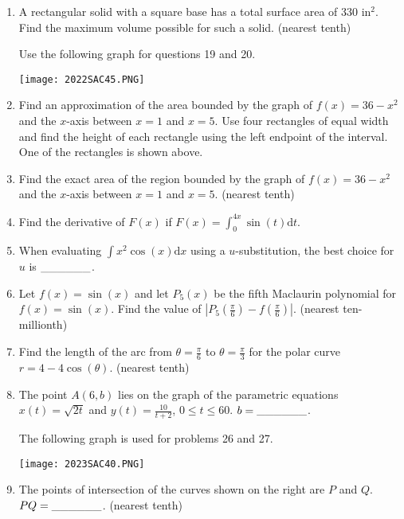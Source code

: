 \documentclass[../uilmath.tex]{subfiles}
\begin{document}
\begin{enumerate}[label=\bfseries\arabic*.]
    \item %
    A rectangular solid with a square base has a total surface area of 330 in$^2$. Find the maximum volume possible for such a solid. (nearest tenth)


    Use the following graph for questions 19 and 20.
    \begin{center}
        \texttt{[image: 2022SAC45.PNG]}
    \end{center}
    \item %
    Find an approximation of the area bounded by the graph of $f(x)=36-x^2$ and the $x$-axis between $x=1$ and $x=5$. 
    Use four rectangles of equal width and find the height of each rectangle using the left endpoint of the interval. One of the rectangles is shown above.

    \item %
    Find the exact area of the region bounded by the graph of $f(x)=36-x^2$ and the $x$-axis between $x=1$ and $x=5$. (nearest tenth)

    \item %
    Find the derivative of $F(x)$ if $F(x)=\int_0^{4x}\sin(t)\mathrm{d}t$.

    \item %
    When evaluating $\int x^2\cos(x)\mathrm{d}x$ using a $u$-substitution, the best choice for $u$ is $\_\_\_\_\_\_$.

    \item %
    Let $f(x)=\sin(x)$ and let $P_5(x)$ be the fifth Maclaurin polynomial for $f(x)=\sin(x)$. Find the value of 
    $\left|P_5\left(\frac{\pi}{6}\right)-f\left(\frac{\pi}{6}\right)\right|$. (nearest ten-millionth)

    \item %
    Find the length of the arc from $\theta=\frac{\pi}{6}$ to $\theta=\frac{\pi}{3}$ for the polar curve $r=4-4\cos(\theta)$. (nearest tenth)

    \item %
    The point $A(6,b)$ lies on the graph of the parametric equations $x(t)=\sqrt{2t}$ and $y(t)=\frac{10}{t+2}$, $0\leq t\leq 60$.
    $b=\_\_\_\_\_\_$.


    The following graph is used for problems 26 and 27.
    \begin{center}
        \texttt{[image: 2023SAC40.PNG]}
    \end{center}
    \item %
    The points of intersection of the curves shown on the right are $P$ and $Q$. $PQ=\_\_\_\_\_\_$. (nearest tenth)


\end{enumerate}
\end{document}
